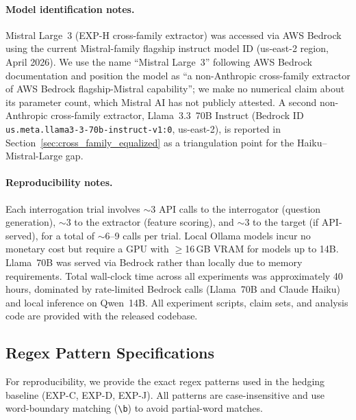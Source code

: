 \paragraph{Model identification notes.} Mistral Large~3 (EXP-H cross-family extractor) was accessed via AWS Bedrock using the current Mistral-family flagship instruct model ID (us-east-2 region, April 2026). We use the name ``Mistral Large~3'' following AWS Bedrock documentation and position the model as ``a non-Anthropic cross-family extractor of AWS Bedrock flagship-Mistral capability''; we make no numerical claim about its parameter count, which Mistral AI has not publicly attested. A second non-Anthropic cross-family extractor, Llama~3.3~70B Instruct (Bedrock ID \texttt{us.meta.llama3-3-70b-instruct-v1:0}, us-east-2), is reported in Section~\ref{sec:cross_family_equalized} as a triangulation point for the Haiku--Mistral-Large gap.

\paragraph{Reproducibility notes.} Each interrogation trial involves $\sim$3 API calls to the interrogator (question generation), $\sim$3 to the extractor (feature scoring), and $\sim$3 to the target (if API-served), for a total of $\sim$6--9 calls per trial. Local Ollama models incur no monetary cost but require a GPU with $\geq$16\,GB VRAM for models up to 14B. Llama~70B was served via Bedrock rather than locally due to memory requirements. Total wall-clock time across all experiments was approximately 40 hours, dominated by rate-limited Bedrock calls (Llama~70B and Claude Haiku) and local inference on Qwen~14B. All experiment scripts, claim sets, and analysis code are provided with the released codebase.

\subsection{Regex Pattern Specifications}
\label{app:regex_patterns}

For reproducibility, we provide the exact regex patterns used in the hedging baseline (EXP-C, EXP-D, EXP-J). All patterns are case-insensitive and use word-boundary matching (\texttt{\textbackslash b}) to avoid partial-word matches.

